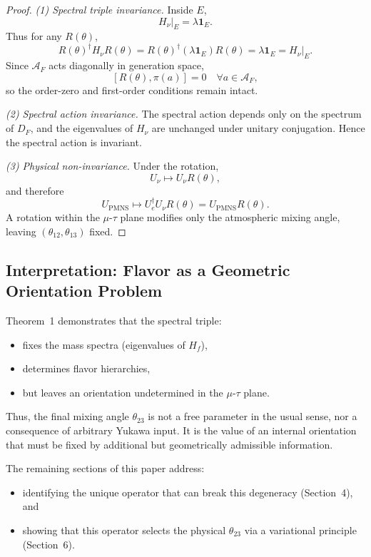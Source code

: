 \begin{proof}
\emph{(1) Spectral triple invariance.}
Inside $E$,
\[
H_\nu|_E = \lambda \mathbf 1_E.
\]
Thus for any $R(\theta)$,
\[
R(\theta)^\dagger H_\nu R(\theta)
= R(\theta)^\dagger (\lambda \mathbf 1_E) R(\theta)
= \lambda \mathbf 1_E
= H_\nu|_E.
\]
Since $\mathcal A_F$ acts diagonally in generation space,
\[
[R(\theta),\pi(a)] = 0 \quad \forall a\in\mathcal A_F,
\]
so the order-zero and first-order conditions remain intact.

\emph{(2) Spectral action invariance.}
The spectral action depends only on the spectrum of $D_F$, and the eigenvalues of $H_\nu$ are unchanged under unitary conjugation. Hence the spectral action is invariant.

\emph{(3) Physical non-invariance.}
Under the rotation,
\[
U_\nu \longmapsto U_\nu R(\theta),
\]
and therefore
\[
U_{\mathrm{PMNS}} \longmapsto U_e^\dagger U_\nu R(\theta)
= U_{\mathrm{PMNS}} R(\theta).
\]
A rotation within the $\mu$-$\tau$ plane modifies only the atmospheric mixing angle, leaving $(\theta_{12},\theta_{13})$ fixed.
\end{proof}

\subsection{Interpretation: Flavor as a Geometric Orientation Problem}

Theorem~1 demonstrates that the spectral triple:
\begin{itemize}
\item fixes the mass spectra (eigenvalues of $H_f$),
\item determines flavor hierarchies,
\item but leaves an orientation undetermined in the $\mu$-$\tau$ plane.
\end{itemize}

Thus, the final mixing angle $\theta_{23}$ is not a free parameter in the usual sense, nor a consequence of arbitrary Yukawa input. It is the value of an internal orientation that must be fixed by additional but geometrically admissible information.

The remaining sections of this paper address:
\begin{itemize}
\item identifying the unique operator that can break this degeneracy (Section~4), and
\item showing that this operator selects the physical $\theta_{23}$ via a variational principle (Section~6).
\end{itemize}

